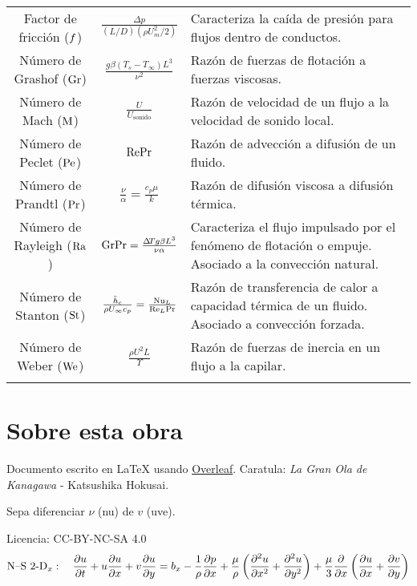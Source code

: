 \begin{table}[htb!]
\begin{tabularx}{12cm}{ *{2}{c}
>{\scriptsize\arraybackslash}X }
Factor de fricción ($f$) & $ \frac{\Delta p}{(L/D)\left(\rho U^2_m/2\right)}$          &Caracteriza la caída de presión para flujos dentro de conductos.                \\
Número de Grashof ($\textrm{Gr}$) &  $\frac{g\beta \left(T_s -T_\infty \right) L^3}{\nu^2}$          &Razón de fuerzas de flotación a fuerzas viscosas.                \\
Número de Mach   ($\textrm{M}$)   &    $\frac{U}{U_{\textrm{sonido}}}$        & Razón de velocidad de un flujo a la velocidad de sonido local.              \\
Número de Peclet ($\textrm{Pe}$)   &    $\textrm{Re}\textrm{Pr}$        & Razón de advección a difusión de un fluido.                \\
Número de Prandtl  ($\textrm{Pr}$) &     $\frac{\nu}{\alpha}=\frac{c_p \mu}{k}$       &Razón de difusión viscosa a difusión térmica.               \\
Número de Rayleigh ($\textrm{Ra}$) &  $\textrm{Gr}\textrm{Pr} = \frac{\Delta \!T g\beta L^3}{\nu \alpha}$          & Caracteriza el flujo impulsado por el fenómeno de flotación o empuje. Asociado a la convección natural.             \\
Número de Stanton ($\textrm{St}$)  &   $\frac{\bar{h}_c }{\rho U_\infty c_p}=\frac{\textrm{Nu}_L}{\textrm{Re}_L \textrm{Pr}}$         &Razón de transferencia de calor a capacidad térmica de un fluido. Asociado a convección forzada.\\
Número de Weber ($\textrm{We}$)  &   $\frac{\rho U^2 L}{\Upsilon}$         &Razón de fuerzas de inercia en un flujo a la capilar.\\
\hhline
\end{tabularx}
\end{table} 

\tableofcontents

\section*{Sobre esta obra}
Documento escrito en \textrm{\LaTeX} usando \href{https://www.overleaf.com}{Overleaf}. Caratula: \emph{ La Gran Ola de Kanagawa }- Katsushika Hokusai. \par

Sepa diferenciar $\nu$ (nu) de $v$ (uve).\par
 \vspace{.1cm}
 \vspace{1cm}
 \begingroup

\selectfont
\noindent
 Licencia: CC-BY-NC-SA 4.0
 \endgroup
 \begingroup
    $$\textrm{N--S 2-D}_x:\quad \frac{\partial u}{\partial t}+u\frac{\partial u}{\partial x}+v\frac{\partial u}{\partial y}=b_x-\frac{1}{\rho}\frac{\partial p}{\partial x}+\frac{\mu}{\rho}\left(\frac{\partial^2 u}{\partial x ^2}+\frac{\partial^2 u}{\partial y ^2}\right) + \frac{\mu}{3}\frac{\partial  }{\partial x}\left( \frac{\partial u}{\partial x}+\frac{\partial v}{\partial y}\right)$$
 \endgroup